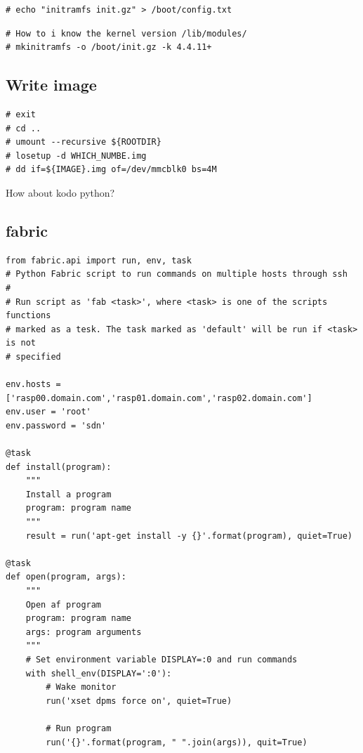 \begin{lstlisting}[]
# echo "initramfs init.gz" > /boot/config.txt
\end{lstlisting}
\FloatBarrier

\begin{lstlisting}[]
# How to i know the kernel version /lib/modules/
# mkinitramfs -o /boot/init.gz -k 4.4.11+
\end{lstlisting}
\FloatBarrier

\subsection{Write image}

\begin{lstlisting}[]
# exit
# cd ..
# umount --recursive ${ROOTDIR}
# losetup -d WHICH_NUMBE.img
# dd if=${IMAGE}.img of=/dev/mmcblk0 bs=4M
\end{lstlisting}
\FloatBarrier

How about kodo python?

\subsection{fabric}

\begin{lstlisting}[]
from fabric.api import run, env, task
# Python Fabric script to run commands on multiple hosts through ssh
#
# Run script as 'fab <task>', where <task> is one of the scripts functions
# marked as a tesk. The task marked as 'default' will be run if <task> is not
# specified

env.hosts = ['rasp00.domain.com','rasp01.domain.com','rasp02.domain.com']
env.user = 'root'
env.password = 'sdn'

@task
def install(program):
    """
    Install a program
    program: program name
    """
    result = run('apt-get install -y {}'.format(program), quiet=True)

@task
def open(program, args):
    """
    Open af program
    program: program name
    args: program arguments
    """
    # Set environment variable DISPLAY=:0 and run commands
    with shell_env(DISPLAY=':0'):
        # Wake monitor
        run('xset dpms force on', quiet=True)

        # Run program
        run('{}'.format(program, " ".join(args)), quit=True)

\end{lstlisting}
\FloatBarrier

